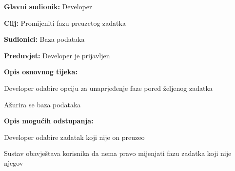                         	\begin{packed_item}
                        		
                        		\item \textbf{Glavni sudionik: }Developer
                        		\item  \textbf{Cilj:} Promijeniti fazu preuzetog zadatka
                        		\item  \textbf{Sudionici:} Baza podataka
                        		\item  \textbf{Preduvjet:} Developer je prijavljen
                        		\item  \textbf{Opis osnovnog tijeka:}
                        		
                        		\item[] \begin{packed_enum}
                        			
                        			\item Developer odabire opciju za unaprjeđenje faze pored željenog zadatka
                        			\item Ažurira se baza podataka
                        			
                        		\end{packed_enum}
                        		
                        		\item  \textbf{Opis mogućih odstupanja:}
                        		
                        		\item[] \begin{packed_item}
                        			
                        			\item[1.a] Developer odabire zadatak koji nije on preuzeo
                        			\item[] \begin{packed_enum}
                        				
                        				\item Sustav obavještava korisnika da nema pravo mijenjati fazu zadatka koji nije njegov
                        				
                        			\end{packed_enum}
                        			
                        			
                        		\end{packed_item}
                        	\end{packed_item}
